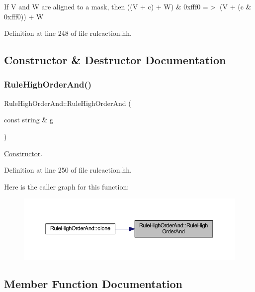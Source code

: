 If V and W are aligned to a mask, then {\ttfamily ((V + c) + W) \& 0xfff0 =$>$ (V + (c \& 0xfff0)) + W} 

Definition at line 248 of file ruleaction.\+hh.



\subsection{Constructor \& Destructor Documentation}
\mbox{\label{class_rule_high_order_and_adb62e27eedfa99a05c22cc4f62a9becf}} 
\subsubsection{\texorpdfstring{RuleHighOrderAnd()}{RuleHighOrderAnd()}}
{\footnotesize\ttfamily Rule\+High\+Order\+And\+::\+Rule\+High\+Order\+And (\begin{DoxyParamCaption}\item[{const string \&}]{g }\end{DoxyParamCaption})\hspace{0.3cm}{\ttfamily [inline]}}



\mbox{\hyperlink{class_constructor}{Constructor}}. 



Definition at line 250 of file ruleaction.\+hh.

Here is the caller graph for this function\+:
\nopagebreak
\begin{figure}[H]
\begin{center}
\leavevmode
\includegraphics[width=350pt]{class_rule_high_order_and_adb62e27eedfa99a05c22cc4f62a9becf_icgraph}
\end{center}
\end{figure}


\subsection{Member Function Documentation}
\mbox{\label{class_rule_high_order_and_acadd25bbb252e1619bf2acc6d3b89e2e}} 
